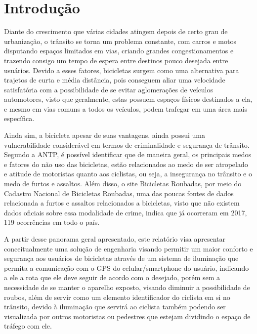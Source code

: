 \chapter{Introdução}
Diante do crescimento que várias cidades atingem depois de certo grau de urbanização, o trânsito se torna um problema constante, com carros e motos disputando espaços limitados em vias, criando grandes congestionamentos e trazendo consigo um tempo de espera entre destinos pouco desejada entre usuários. Devido a esses fatores, bicicletas surgem como uma alternativa para trajetos de curta e média distância, pois conseguem aliar uma velocidade satisfatória com a possibilidade de se evitar aglomerações de veículos automotores, visto que geralmente, estas possuem espaços físicos destinados a ela, e mesmo em vias comuns a todos os veículos, podem trafegar em uma área mais específica. 

Ainda sim, a bicicleta apesar de suas vantagens, ainda possui uma vulnerabilidade considerável em termos de criminalidade e segurança de trânsito. Segundo a ANTP, é possível identificar que de maneira geral, os principais medos e fatores do não uso das bicicletas, estão relacionados ao medo de ser atropelado e atitude de motoristas quanto aos ciclistas, ou seja, a insegurança no trânsito e o medo de furtos e assaltos.  Além disso, o site Bicicletas Roubadas, por meio do Cadastro Nacional de Bicicletas Roubadas, uma das poucas fontes de dados relacionada a furtos e assaltos relacionados a bicicletas, visto que não existem dados oficiais sobre essa modalidade de crime, indica que já ocorreram em 2017, 119 ocorrências em todo o país.

A partir desse panorama geral apresentado, este relatório visa apresentar conceitualmente uma solução de engenharia visando permitir um maior conforto e segurança aos usuários de bicicletas através de um sistema de iluminação que permita a comunicação com o GPS do celular/smartphone do usuário, indicando a ele a rota que ele deve seguir de acordo com o desejado, porém sem a necessidade de se manter o aparelho exposto, visando diminuir a possibilidade de roubos, além de servir como um elemento identificador do ciclista em si no trânsito, devido à iluminação que servirá ao ciclista também podendo ser visualizada por outros motoristas ou pedestres que estejam dividindo o espaço de tráfego com ele. 

